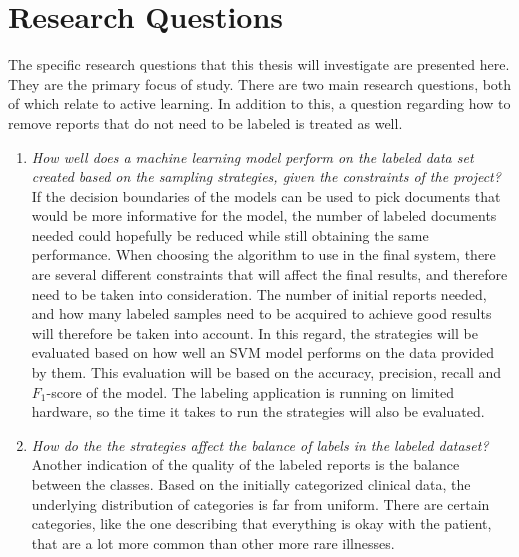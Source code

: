 \section{Research Questions}
\label{sec:research-questions}

The specific research questions that this thesis will investigate are presented here.
They are the primary focus of study.
There are two main research questions, both of which relate to active learning.
In addition to this, a question regarding how to remove reports that do not need to be labeled is treated as well.

\begin{enumerate}
      \item \label{intro:re-q1} 
      \textit{How well does a machine learning model perform on the labeled data set created based on the sampling strategies, given the constraints of the project?}
      \newline
      If the decision boundaries of the models can be used to pick documents that would be more informative for the model, the number of labeled documents needed could hopefully be reduced while still obtaining the same performance.
      When choosing the algorithm to use in the final system, there are several different constraints that will affect the final results, and therefore need to be taken into consideration.
      The number of initial reports needed, and how many labeled samples need to be acquired to achieve good results will therefore be taken into account.
      In this regard, the strategies will be evaluated based on how well an SVM model performs on the data provided by them.
      This evaluation will be based on the accuracy, precision, recall and $F_1$-score of the model.
      The labeling application is running on limited hardware, so the time it takes to run the strategies will also be evaluated.

      \item \label{intro:re-q2}
      \textit{How do the the strategies affect the balance of labels in the labeled dataset?}
      \newline
      Another indication of the quality of the labeled reports is the balance between the classes.
      Based on the initially categorized clinical data, the underlying distribution of categories is far from uniform.
      There are certain categories, like the one describing that everything is okay with the patient, that are a lot more common than other more rare illnesses.


\end{enumerate}

